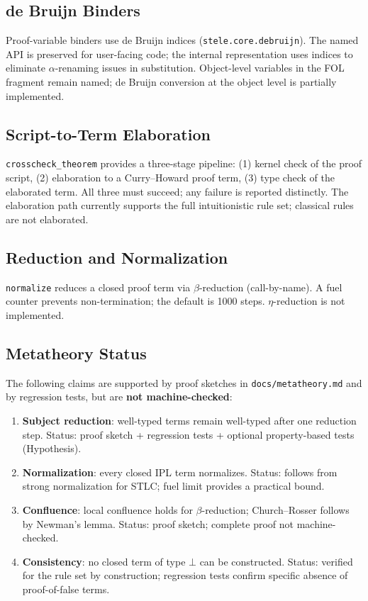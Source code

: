 \documentclass[11pt,a4paper]{article}
\theoremstyle{definition}
\theoremstyle{plain}
\begin{document}
\subsection{de Bruijn Binders}

Proof-variable binders use de Bruijn indices
(\texttt{stele.core.debruijn}).
The named API is preserved for user-facing code; the internal
representation uses indices to eliminate $\alpha$-renaming
issues in substitution.
Object-level variables in the FOL fragment remain named;
de Bruijn conversion at the object level is partially
implemented.

\subsection{Script-to-Term Elaboration}

\texttt{crosscheck\_theorem} provides a three-stage pipeline:
(1) kernel check of the proof script,
(2) elaboration to a Curry--Howard proof term,
(3) type check of the elaborated term.
All three must succeed; any failure is reported distinctly.
The elaboration path currently supports the full intuitionistic
rule set; classical rules are not elaborated.

\subsection{Reduction and Normalization}

\texttt{normalize} reduces a closed proof term via
$\beta$-reduction (call-by-name).
A fuel counter prevents non-termination; the default is 1000
steps.
$\eta$-reduction is not implemented.

\subsection{Metatheory Status}

The following claims are supported by proof sketches in
\texttt{docs/metatheory.md} and by regression tests, but are
\textbf{not machine-checked}:

\begin{enumerate}
  \item \textbf{Subject reduction}: well-typed terms remain
        well-typed after one reduction step.
        Status: proof sketch + regression tests + optional
        property-based tests (Hypothesis).
  \item \textbf{Normalization}: every closed IPL term
        normalizes.
        Status: follows from strong normalization for STLC;
        fuel limit provides a practical bound.
  \item \textbf{Confluence}: local confluence holds for
        $\beta$-reduction; Church--Rosser follows by Newman's
        lemma.
        Status: proof sketch; complete proof not machine-checked.
  \item \textbf{Consistency}: no closed term of type $\bot$
        can be constructed.
        Status: verified for the rule set by construction;
        regression tests confirm specific absence of
        proof-of-false terms.
\end{enumerate}
\end{document}
